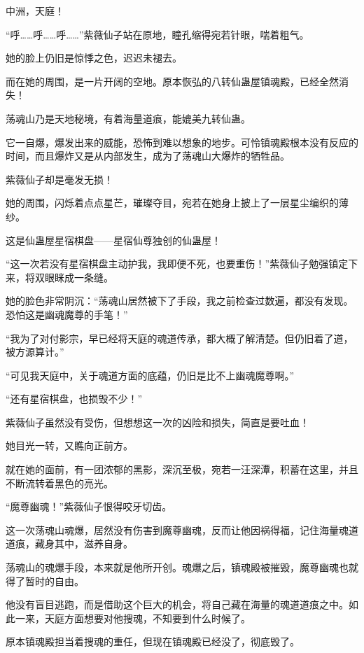 
\begin{this_body}

中洲，天庭！

“呼……呼……呼……”紫薇仙子站在原地，瞳孔缩得宛若针眼，喘着粗气。

她的脸上仍旧是惊悸之色，迟迟未褪去。

而在她的周围，是一片开阔的空地。原本恢弘的八转仙蛊屋镇魂殿，已经全然消失！

荡魂山乃是天地秘境，有着海量道痕，能媲美九转仙蛊。

它一自爆，爆发出来的威能，恐怖到难以想象的地步。可怜镇魂殿根本没有反应的时间，而且爆炸又是从内部发生，成为了荡魂山大爆炸的牺牲品。

紫薇仙子却是毫发无损！

她的周围，闪烁着点点星芒，璀璨夺目，宛若在她身上披上了一层星尘编织的薄纱。

这是仙蛊屋星宿棋盘——星宿仙尊独创的仙蛊屋！

“这一次若没有星宿棋盘主动护我，我即便不死，也要重伤！”紫薇仙子勉强镇定下来，将双眼眯成一条缝。

她的脸色非常阴沉：“荡魂山居然被下了手段，我之前检查过数遍，都没有发现。恐怕这是幽魂魔尊的手笔！”

“我为了对付影宗，早已经将天庭的魂道传承，都大概了解清楚。但仍旧着了道，被方源算计。”

“可见我天庭中，关于魂道方面的底蕴，仍旧是比不上幽魂魔尊啊。”

“还有星宿棋盘，也损毁不少！”

紫薇仙子虽然没有受伤，但想想这一次的凶险和损失，简直是要吐血！

她目光一转，又瞧向正前方。

就在她的面前，有一团浓郁的黑影，深沉至极，宛若一汪深潭，积蓄在这里，并且不断流转着黑色的亮光。

“魔尊幽魂！”紫薇仙子恨得咬牙切齿。

这一次荡魂山魂爆，居然没有伤害到魔尊幽魂，反而让他因祸得福，记住海量魂道道痕，藏身其中，滋养自身。

荡魂山的魂爆手段，本来就是他所开创。魂爆之后，镇魂殿被摧毁，魔尊幽魂也就得了暂时的自由。

他没有盲目逃跑，而是借助这个巨大的机会，将自己藏在海量的魂道道痕之中。如此一来，天庭方面想要对他搜魂，不知要到什么时候了。

原本镇魂殿担当着搜魂的重任，但现在镇魂殿已经没了，彻底毁了。


\end{this_body}

